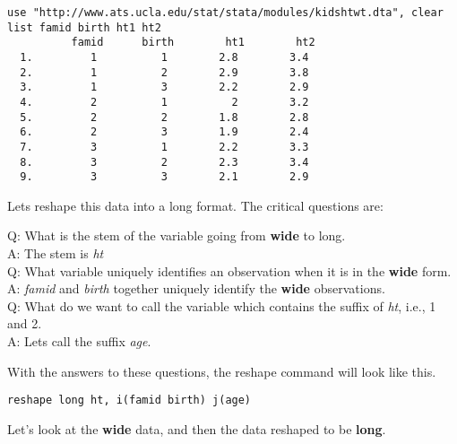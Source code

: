 \begin{lstlisting}
use "http://www.ats.ucla.edu/stat/stata/modules/kidshtwt.dta", clear
list famid birth ht1 ht2
          famid      birth        ht1        ht2
  1.         1          1        2.8        3.4
  2.         1          2        2.9        3.8
  3.         1          3        2.2        2.9
  4.         2          1          2        3.2
  5.         2          2        1.8        2.8
  6.         2          3        1.9        2.4
  7.         3          1        2.2        3.3
  8.         3          2        2.3        3.4
  9.         3          3        2.1        2.9
\end{lstlisting}

Lets reshape this data into a long format. The critical questions are:

\noindent Q: What is the stem of the variable going from \textbf{wide} to long.\\
A: The stem is \textit{ht}\\
Q: What variable uniquely identifies an observation when it is in the \textbf{wide} form.\\
A: \textit{famid} and \textit{birth} together uniquely identify the \textbf{wide} observations.\\
Q: What do we want to call the variable which contains the suffix of \textit{ht}, i.e., 1 and 2.\\
A: Lets call the suffix \textit{age}.

With the answers to these questions, the reshape command will look like this.

\begin{lstlisting}
reshape long ht, i(famid birth) j(age)
\end{lstlisting}

Let's look at the \textbf{wide} data, and then the data reshaped to be \textbf{long}.

